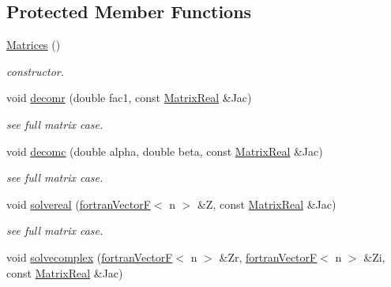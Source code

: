 \subsection*{Protected Member Functions}
\begin{DoxyCompactItemize}
\item 
\hyperlink{classodes_1_1Matrices_3_01false_00_01false_00_01n_00_01nsub_00_01nsup_01_4_a20f562ec507babcd1ee23844f2c90b7e}{Matrices} ()
\begin{DoxyCompactList}\small\item\em constructor. \end{DoxyCompactList}\item 
void \hyperlink{classodes_1_1Matrices_3_01false_00_01false_00_01n_00_01nsub_00_01nsup_01_4_aec1919c48acf54a474a69c9b2d1db952}{decomr} (double fac1, const \hyperlink{classodes_1_1Matrices_3_01false_00_01false_00_01n_00_01nsub_00_01nsup_01_4_a16870437fa110da1b60636c6e108b357}{Matrix\+Real} \&Jac)
\begin{DoxyCompactList}\small\item\em see full matrix case. \end{DoxyCompactList}\item 
void \hyperlink{classodes_1_1Matrices_3_01false_00_01false_00_01n_00_01nsub_00_01nsup_01_4_a86f9653f45c84a8b35cceb44ae0491d1}{decomc} (double alpha, double beta, const \hyperlink{classodes_1_1Matrices_3_01false_00_01false_00_01n_00_01nsub_00_01nsup_01_4_a16870437fa110da1b60636c6e108b357}{Matrix\+Real} \&Jac)
\begin{DoxyCompactList}\small\item\em see full matrix case. \end{DoxyCompactList}\item 
void \hyperlink{classodes_1_1Matrices_3_01false_00_01false_00_01n_00_01nsub_00_01nsup_01_4_a5fd66e27292eca6b52c24b14a1a123e5}{solvereal} (\hyperlink{classodes_1_1fortranVectorF}{fortran\+Vector\+F}$<$ n $>$ \&Z, const \hyperlink{classodes_1_1Matrices_3_01false_00_01false_00_01n_00_01nsub_00_01nsup_01_4_a16870437fa110da1b60636c6e108b357}{Matrix\+Real} \&Jac)
\begin{DoxyCompactList}\small\item\em see full matrix case. \end{DoxyCompactList}\item 
void \hyperlink{classodes_1_1Matrices_3_01false_00_01false_00_01n_00_01nsub_00_01nsup_01_4_a78bffe78fc1f1e5a1380a74c76d25f6f}{solvecomplex} (\hyperlink{classodes_1_1fortranVectorF}{fortran\+Vector\+F}$<$ n $>$ \&Zr, \hyperlink{classodes_1_1fortranVectorF}{fortran\+Vector\+F}$<$ n $>$ \&Zi, const \hyperlink{classodes_1_1Matrices_3_01false_00_01false_00_01n_00_01nsub_00_01nsup_01_4_a16870437fa110da1b60636c6e108b357}{Matrix\+Real} \&Jac)

\end{DoxyCompactItemize}
